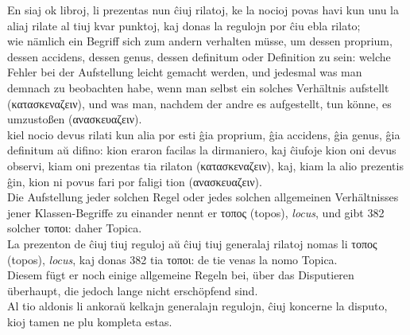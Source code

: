 \documentclass{book}
\newcommand{\de}[1]{{\color{red}#1}\\}
\newcommand{\eo}[1]{#1\\}
\newcommand{\eble}[1]{{\color{blue}#1}}
\begin{document}
\eo{En siaj ok libroj, li prezentas nun ĉiuj rilatoj, ke la nocioj
povas havi \eble{kun unu la aliaj} rilate al tiuj kvar punktoj, kaj donas
la regulojn por ĉiu ebla rilato;}
\de{wie nämlich ein Begriff sich zum andern verhalten
müsse, um dessen proprium, dessen accidens,
dessen genus, dessen definitum oder Definition
zu sein: welche Fehler bei der Aufstellung leicht
gemacht werden, und jedesmal was man demnach
zu beobachten habe, wenn man selbst ein solches
Verhältnis aufstellt (\textgreek{κατασκεναζειν}), und was
man, nachdem der andre es aufgestellt, tun könne,
es umzustoßen (\textgreek{ανασκευαζειν}).}
\eo{kiel nocio devus rilati kun alia por esti ĝia proprium, ĝia
accidens, ĝia genus, ĝia definitum aŭ difino: kion eraron facilas la
dirmaniero, kaj ĉiufoje kion oni devus observi, kiam oni prezentas
\eble{tia rilaton} (\textgreek{κατασκεναζειν}), kaj, kiam la alio
prezentis ĝin, kion ni povus fari por \eble{faligi} tion
(\textgreek{ανασκευαζειν}).}
\de{Die Aufstellung
jeder solchen Regel oder jedes solchen allgemeinen
Verhältnisses jener Klassen-Begriffe zu einander
nennt er \textgreek{τοπος} (topos), {\it locus}, und gibt 382
solcher \textgreek{τοποι}: daher Topica.}
\eo{La prezenton de ĉiuj tiuj reguloj aŭ ĉiuj tiuj generalaj rilatoj nomas
li \textgreek{τοπος} (topos), {\it locus}, kaj donas 382 tia
\textgreek{τοποι}: de tie venas la nomo Topica.}
\de{Diesem fügt er noch
einige allgemeine Regeln bei, über das Disputieren
überhaupt, die jedoch lange nicht erschöpfend
sind.}
\eo{Al tio aldonis li ankoraŭ kelkajn generalajn regulojn, ĉiuj koncerne
la disputo, kioj tamen ne plu kompleta estas.}
\end{document}
